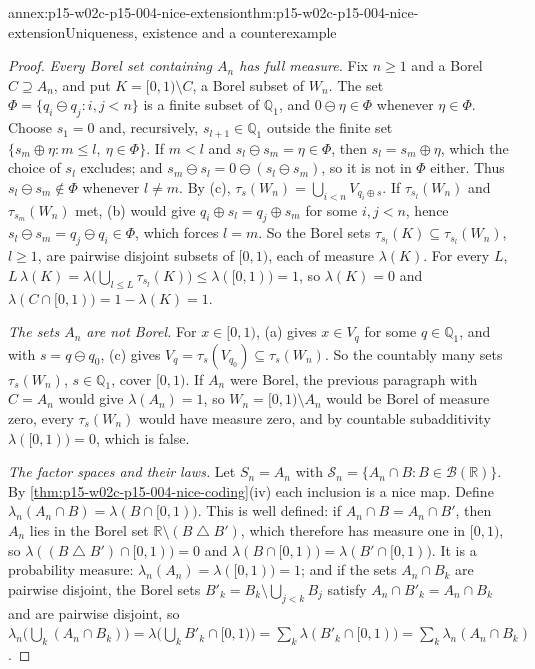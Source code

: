 \begin{annexitem}{annex:p15-w02c-p15-004-nice-extension}{thm:p15-w02c-p15-004-nice-extension}{Uniqueness, existence and a counterexample}
\begin{proof}
\emph{Every Borel set containing \(A_n\) has full measure.} Fix \(n\geq1\)
and a Borel \(C\supseteq A_n\), and put \(K=[0,1)\setminus C\), a Borel
subset of \(W_n\). The set \(\Phi=\{q_i\ominus q_j:i,j<n\}\) is a finite
subset of \(\mathbb Q_1\), and \(0\ominus\eta\in\Phi\) whenever
\(\eta\in\Phi\). Choose \(s_1=0\) and, recursively,
\(s_{l+1}\in\mathbb Q_1\) outside the finite set
\(\{s_m\oplus\eta:m\leq l,\ \eta\in\Phi\}\). If \(m<l\) and
\(s_l\ominus s_m=\eta\in\Phi\), then \(s_l=s_m\oplus\eta\), which the
choice of \(s_l\) excludes; and \(s_m\ominus s_l=0\ominus(s_l\ominus s_m)\),
so it is not in \(\Phi\) either. Thus \(s_l\ominus s_m\notin\Phi\) whenever
\(l\neq m\). By (c), \(\tau_s(W_n)=\bigcup_{i<n}V_{q_i\oplus s}\). If
\(\tau_{s_l}(W_n)\) and \(\tau_{s_m}(W_n)\) met, (b) would give
\(q_i\oplus s_l=q_j\oplus s_m\) for some \(i,j<n\), hence
\(s_l\ominus s_m=q_j\ominus q_i\in\Phi\), which forces \(l=m\). So the
Borel sets \(\tau_{s_l}(K)\subseteq\tau_{s_l}(W_n)\), \(l\geq1\), are
pairwise disjoint subsets of \([0,1)\), each of measure \(\lambda(K)\).
For every \(L\),
\(L\,\lambda(K)=\lambda\bigl(\bigcup_{l\leq L}\tau_{s_l}(K)\bigr)\leq\lambda([0,1))=1\),
so \(\lambda(K)=0\) and \(\lambda(C\cap[0,1))=1-\lambda(K)=1\).

\emph{The sets \(A_n\) are not Borel.} For \(x\in[0,1)\), (a) gives
\(x\in V_q\) for some \(q\in\mathbb Q_1\), and with \(s=q\ominus q_0\),
(c) gives \(V_q=\tau_s(V_{q_0})\subseteq\tau_s(W_n)\). So the countably many
sets \(\tau_s(W_n)\), \(s\in\mathbb Q_1\), cover \([0,1)\). If \(A_n\) were
Borel, the previous paragraph with \(C=A_n\) would give
\(\lambda(A_n)=1\), so \(W_n=[0,1)\setminus A_n\) would be Borel of measure
zero, every \(\tau_s(W_n)\) would have measure zero, and by countable
subadditivity \(\lambda([0,1))=0\), which is false.

\emph{The factor spaces and their laws.} Let \(S_n=A_n\) with
\(\mathcal S_n=\{A_n\cap B:B\in\mathcal B(\mathbb R)\}\). By
\cref{thm:p15-w02c-p15-004-nice-coding}(iv) each inclusion is a nice map.
Define \(\lambda_n(A_n\cap B)=\lambda(B\cap[0,1))\). This is well defined:
if \(A_n\cap B=A_n\cap B'\), then \(A_n\) lies in the Borel set
\(\mathbb R\setminus(B\mathbin{\triangle}B')\), which therefore has measure
one in \([0,1)\), so \(\lambda((B\mathbin{\triangle}B')\cap[0,1))=0\) and
\(\lambda(B\cap[0,1))=\lambda(B'\cap[0,1))\). It is a probability measure:
\(\lambda_n(A_n)=\lambda([0,1))=1\); and if the sets \(A_n\cap B_k\) are
pairwise disjoint, the Borel sets
\(B'_k=B_k\setminus\bigcup_{j<k}B_j\) satisfy \(A_n\cap B'_k=A_n\cap B_k\)
and are pairwise disjoint, so
\(\lambda_n\bigl(\bigcup_k(A_n\cap B_k)\bigr)=\lambda\bigl(\bigcup_kB'_k\cap[0,1)\bigr)
=\sum_k\lambda(B'_k\cap[0,1))=\sum_k\lambda_n(A_n\cap B_k)\).


\end{proof}
\end{annexitem}
